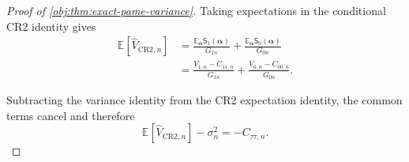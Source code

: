 \begin{proof}[Proof of \cref{obj:thm:exact-pame-variance}]
Taking expectations in the conditional CR2 identity gives
\[
\begin{aligned}
\mathbb E[\widehat V_{\mathrm{CR2},n}]
&=
\frac{\mathbb E_{\boldsymbol\alpha}\mathsf S_1(\boldsymbol\alpha)}{G_{1n}}
+
\frac{\mathbb E_{\boldsymbol\alpha}\mathsf S_0(\boldsymbol\alpha)}{G_{0n}} \\
&=
\frac{V_{1,n}-C_{11,n}}{G_{1n}}
+
\frac{V_{0,n}-C_{00,n}}{G_{0n}} .
\end{aligned}
\]

Subtracting the variance identity from the CR2 expectation identity, the common terms cancel and therefore
\[
\mathbb E[\widehat V_{\mathrm{CR2},n}]-\sigma_n^2
=
-C_{\tau\tau,n}.
\]
\end{proof}
